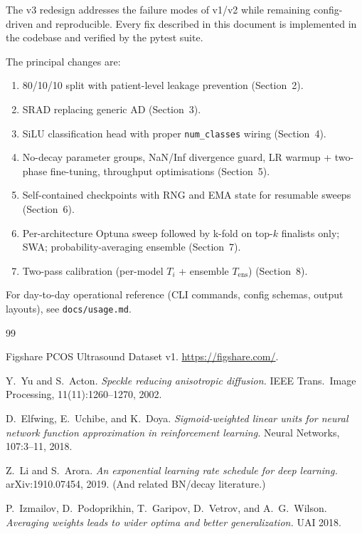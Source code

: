 \documentclass[10pt,a4paper]{article}
\begin{document}
The v3 redesign addresses the failure modes of v1/v2 while remaining
config-driven and reproducible. Every fix described in this document
is implemented in the codebase and verified by the pytest suite.

The principal changes are:

\begin{enumerate}[leftmargin=*]
  \item 80/10/10 split with patient-level leakage prevention
        (Section~2).
  \item SRAD replacing generic AD (Section~3).
  \item SiLU classification head with proper \texttt{num\_classes}
        wiring (Section~4).
  \item No-decay parameter groups, NaN/Inf divergence guard, LR
        warmup + two-phase fine-tuning, throughput optimisations
        (Section~5).
  \item Self-contained checkpoints with RNG and EMA state for
        resumable sweeps (Section~6).
  \item Per-architecture Optuna sweep followed by k-fold on top-$k$
        finalists only; SWA; probability-averaging ensemble
        (Section~7).
  \item Two-pass calibration (per-model $T_i$ + ensemble
        $T_{\text{ens}}$) (Section~8).
\end{enumerate}

For day-to-day operational reference (CLI commands, config schemas,
output layouts), see \texttt{docs/usage.md}.

\begin{thebibliography}{99}

  Figshare PCOS Ultrasound Dataset v1.
  \url{https://figshare.com/}.

  Y.~Yu and S.~Acton.
  \textit{Speckle reducing anisotropic diffusion.}
  IEEE Trans.\ Image Processing, 11(11):1260--1270, 2002.

  D.~Elfwing, E.~Uchibe, and K.~Doya.
  \textit{Sigmoid-weighted linear units for neural network function
  approximation in reinforcement learning.}
  Neural Networks, 107:3--11, 2018.

  Z.~Li and S.~Arora.
  \textit{An exponential learning rate schedule for deep learning.}
  arXiv:1910.07454, 2019. (And related BN/decay literature.)

  P.~Izmailov, D.~Podoprikhin, T.~Garipov, D.~Vetrov, and A.~G.~Wilson.
  \textit{Averaging weights leads to wider optima and better
  generalization.}
  UAI 2018.

\end{thebibliography}
\end{document}
